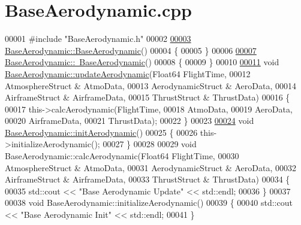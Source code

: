 \hypertarget{_base_aerodynamic_8cpp_source}{}\section{Base\+Aerodynamic.\+cpp}
\label{_base_aerodynamic_8cpp_source}

\begin{DoxyCode}
00001 \textcolor{preprocessor}{#include "BaseAerodynamic.h"}
00002 
\hyperlink{group___aerodynamic_aa05d0598119b1364cdb45cf478ae578c}{00003} \hyperlink{group___aerodynamic_aa05d0598119b1364cdb45cf478ae578c}{BaseAerodynamic::BaseAerodynamic}()
00004 \{
00005 \}
00006 
\hyperlink{group___aerodynamic_a81d08f3a779e6e25245b6f3b545920cb}{00007} \hyperlink{group___aerodynamic_a81d08f3a779e6e25245b6f3b545920cb}{BaseAerodynamic::~BaseAerodynamic}()
00008 \{
00009 \}
00010 
\hyperlink{group___aerodynamic_a6354f3c8433c7a2235041f843d4fe10e}{00011} \textcolor{keywordtype}{void} \hyperlink{group___aerodynamic_a6354f3c8433c7a2235041f843d4fe10e}{BaseAerodynamic::updateAerodynamic}(Float64 FlightTime, 
00012                                         AtmosphereStruct & AtmoData, 
00013                                         AerodynamicStruct & AeroData, 
00014                                         AirframeStruct & AirframeData, 
00015                                         ThrustStruct & ThrustData)
00016 \{
00017     this->calcAerodynamic(FlightTime,
00018                         AtmoData,
00019                         AeroData,
00020                         AirframeData,
00021                         ThrustData);
00022 \}
00023 
\hyperlink{group___aerodynamic_aaeebe11ae40e87069a13256d1de4f1bb}{00024} \textcolor{keywordtype}{void} \hyperlink{group___aerodynamic_aaeebe11ae40e87069a13256d1de4f1bb}{BaseAerodynamic::initAerodynamic}()
00025 \{
00026     this->initializeAerodynamic();
00027 \}
00028 
00029 \textcolor{keywordtype}{void} BaseAerodynamic::calcAerodynamic(Float64 FlightTime,
00030                                       AtmosphereStruct & AtmoData, 
00031                                       AerodynamicStruct & AeroData,
00032                                       AirframeStruct & AirframeData,
00033                                       ThrustStruct & ThrustData)
00034 \{
00035     std::cout << \textcolor{stringliteral}{"Base Aerodynamic Update"} << std::endl;
00036 \}
00037 
00038 \textcolor{keywordtype}{void} BaseAerodynamic::initializeAerodynamic()
00039 \{
00040     std::cout << \textcolor{stringliteral}{"Base Aerodynamic Init"} << std::endl;
00041 \}
\end{DoxyCode}
